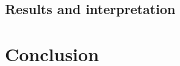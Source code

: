 \documentclass[a4paper,oneside]{memoir}
\begin{document}
\section{Results and interpretation}



\chapter{Conclusion}

%
%
%
\end{document}
